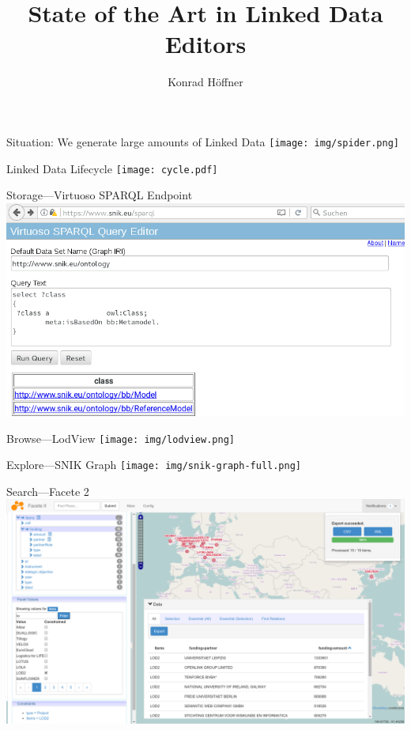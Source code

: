 \documentclass[aspectratio=1610]{beamer}
\title{State of the Art in Linked Data Editors}
\author{Konrad Höffner}
\begin{document}
\begin{frame}
\titlepage
\end{frame}

\begin{frame}{Situation: We generate large amounts of Linked Data}
\centering
\texttt{[image: img/spider.png]}
\end{frame}

\begin{frame}{Linked Data Lifecycle}
\centering
\texttt{[image: cycle.pdf]}
\end{frame}

\begin{frame}{Storage---Virtuoso SPARQL Endpoint}
\centering
\includegraphics[width=\textwidth]{img/sparqlresult.png}
\end{frame}

\begin{frame}{Browse---LodView}
\centering
\texttt{[image: img/lodview.png]}
\end{frame}

\begin{frame}{Explore---SNIK Graph}
\centering
\texttt{[image: img/snik-graph-full.png]}
\end{frame}

\begin{frame}{Search---Facete 2}
\centering
\includegraphics[width=\textwidth]{img/facete2.png}
\end{frame}
\end{document}
